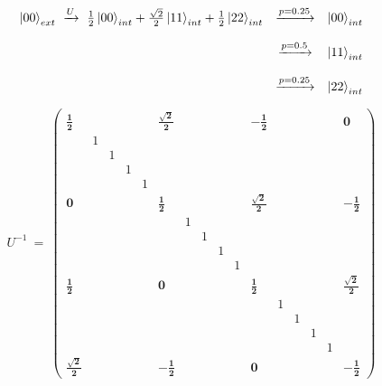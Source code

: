 \documentclass[12pt]{article}
\begin{document}
\begin{equation}
\begin{matrix}
\ket{00}_{ext} \ \xrightarrow{U} \ \frac{1}{2}\ket{00}_{int} + \frac{\sqrt{2}}{2}\ket{11}_{int} + \frac{1}{2}\ket{22}_{int} 
& \xrightarrow{p = 0.25} & \ket{00}_{int} \\ \\
& \xrightarrow{p = 0.5} & \ket{11}_{int} \\ \\
& \xrightarrow{p = 0.25} & \ket{22}_{int}
\end{matrix}
\end{equation}



\begin{equation}
U^{-1}\ =\ 
\begin{pmatrix}
\pmb{\frac{1}{2}} &&&&& \pmb{\frac{\sqrt{2}}{2}} &&&&& \pmb{-\frac{1}{2}} &&&&& \pmb{0} \\
  & 1 &   &   &   &   &   &   &   &   &   &   &   &   &   &   \\
  &   & 1 &   &   &   &   &   &   &   &   &   &   &   &   &   \\
  &   &   & 1 &   &   &   &   &   &   &   &   &   &   &   &   \\
  &   &   &   & 1 &   &   &   &   &   &   &   &   &   &   &   \\
\pmb{0} &&&&& \pmb{\frac{1}{2}} &&&&& \pmb{\frac{\sqrt{2}}{2}} &&&&& \pmb{-\frac{1}{2}} \\
  &   &   &   &   &   & 1 &   &   &   &   &   &   &   &   &   \\
  &   &   &   &   &   &   & 1 &   &   &   &   &   &   &   &   \\
  &   &   &   &   &   &   &   & 1 &   &   &   &   &   &   &   \\
  &   &   &   &   &   &   &   &   & 1 &   &   &   &   &   &   \\
\pmb{\frac{1}{2}} &&&&& \pmb{0} &&&&& \pmb{\frac{1}{2}} &&&&& \pmb{\frac{\sqrt{2}}{2}} \\
  &   &   &   &   &   &   &   &   &   &   & 1 &   &   &   &   \\
  &   &   &   &   &   &   &   &   &   &   &   & 1 &   &   &   \\
  &   &   &   &   &   &   &   &   &   &   &   &   & 1 &   &   \\
  &   &   &   &   &   &   &   &   &   &   &   &   &   & 1 &   \\
\pmb{\frac{\sqrt{2}}{2}} &&&&& \pmb{-\frac{1}{2}} &&&&& \pmb{0} &&&&& \pmb{-\frac{1}{2}} 
\end{pmatrix}

\end{equation}
\end{document}
